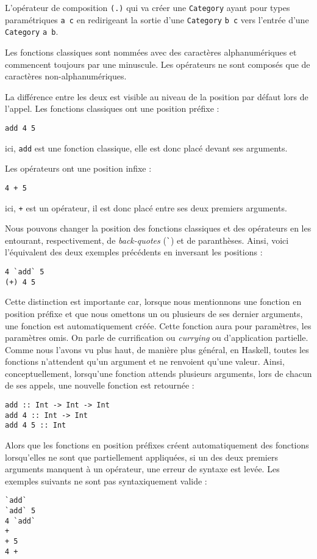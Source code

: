 \documentclass{llncs}
\begin{document}
L'opérateur de composition \lstinline{(.)} qui va créer une \lstinline{Category}
ayant pour types paramétriques \lstinline{a c} en redirigeant la sortie d'une
\lstinline{Category} \lstinline{b c} vers l'entrée d'une \lstinline{Category} \lstinline{a b}.

Les fonctions classiques sont nommées avec des caractères alphanumériques et commencent
toujours par une minuscule.
Les opérateurs ne sont composés que de caractères non-alphanumériques.

La différence entre les deux est visible au niveau de la position par défaut lors
de l'appel.
Les fonctions classiques ont une position préfixe :
\begin{lstlisting}
add 4 5
\end{lstlisting}

ici, \lstinline{add} est une fonction classique, elle est donc placé devant ses
arguments.

Les opérateurs ont une position infixe :
\begin{lstlisting}
4 + 5
\end{lstlisting}

ici, \lstinline{+} est un opérateur, il est donc placé entre ses deux premiers
arguments.

Nous pouvons changer la position des fonctions classiques et des opérateurs en
les entourant, respectivement, de \emph{back-quotes} (\lstinline{`}) et de paranthèses.
Ainsi, voici l'équivalent des deux exemples précédents en inversant les positions :
\begin{lstlisting}
4 `add` 5
(+) 4 5
\end{lstlisting}

Cette distinction est importante car, lorsque nous mentionnons une fonction en position
préfixe et que nous omettons un ou plusieurs de ses dernier arguments, une fonction
est automatiquement créée.
Cette fonction aura pour paramètres, les paramètres omis.
On parle de currification ou \emph{currying} ou d'application partielle.
Comme nous l'avons vu plus haut, de manière plus général, en Haskell, toutes les
fonctions n'attendent qu'un argument et ne renvoient qu'une valeur.
Ainsi, conceptuellement, lorsqu'une fonction attends plusieurs arguments, lors de
chacun de ses appels, une nouvelle fonction est retournée :
\begin{lstlisting}
add :: Int -> Int -> Int
add 4 :: Int -> Int
add 4 5 :: Int
\end{lstlisting}

Alors que les fonctions en position préfixes créent automatiquement des fonctions
lorsqu'elles ne sont que partiellement appliquées, si un des deux premiers arguments
manquent à un opérateur, une erreur de syntaxe est levée.
Les exemples suivants ne sont pas syntaxiquement valide :
\begin{lstlisting}
`add`
`add` 5
4 `add`
+
+ 5
4 +
\end{lstlisting}
\end{document}
